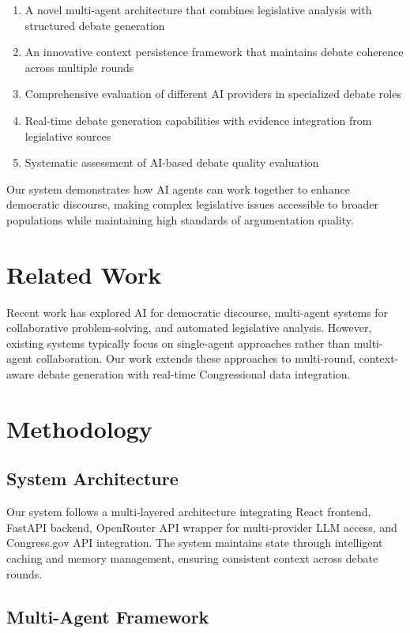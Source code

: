 \documentclass{article}
\begin{document}
\begin{enumerate}
    \item A novel multi-agent architecture that combines legislative analysis with structured debate generation
    \item An innovative context persistence framework that maintains debate coherence across multiple rounds
    \item Comprehensive evaluation of different AI providers in specialized debate roles
    \item Real-time debate generation capabilities with evidence integration from legislative sources
    \item Systematic assessment of AI-based debate quality evaluation
\end{enumerate}

Our system demonstrates how AI agents can work together to enhance democratic discourse, making complex legislative issues accessible to broader populations while maintaining high standards of argumentation quality.

\section{Related Work}

Recent work has explored AI for democratic discourse, multi-agent systems for collaborative problem-solving, and automated legislative analysis. However, existing systems typically focus on single-agent approaches rather than multi-agent collaboration. Our work extends these approaches to multi-round, context-aware debate generation with real-time Congressional data integration.

\section{Methodology}

\subsection{System Architecture}

Our system follows a multi-layered architecture integrating React frontend, FastAPI backend, OpenRouter API wrapper for multi-provider LLM access, and Congress.gov API integration. The system maintains state through intelligent caching and memory management, ensuring consistent context across debate rounds.

\subsection{Multi-Agent Framework}
\end{document}
